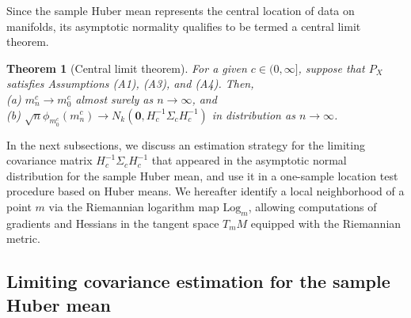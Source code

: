 \documentclass[preprint]{imsart}
\theoremstyle{plain}
\newtheorem{theorem}{Theorem}
\theoremstyle{remark}
\begin{document}
 
Since the sample Huber mean represents the central location of data on manifolds, its asymptotic normality qualifies to be termed a central limit theorem.
\begin{theorem}[Central limit theorem]\label{thm:clt}
For a given $c \in (0, \infty]$, suppose that $P_{X}$ satisfies Assumptions (A1), (A3), and (A4). Then, \\
(a) $m^{c}_{n} \rightarrow m^{c}_{0}$ almost surely as $n \rightarrow \infty$, and \\
(b) $\sqrt{n}\phi_{m^{c}_{0}}(m^{c}_{n}) \rightarrow N_{k}(\mathbf{0}, H_{c}^{-1}\Sigma_{c} H_{c}^{-1})$ in distribution as $n \rightarrow \infty$.
\end{theorem}



In the next subsections, we discuss an estimation strategy for the limiting covariance matrix $H_c^{-1}\Sigma_{c}H_c^{-1}$ that appeared in the asymptotic normal distribution for the sample Huber mean, and use it in a one-sample location test procedure based on Huber means. We hereafter identify a local neighborhood of a point $m$ via the Riemannian logarithm map $\mbox{Log}_m$, allowing computations of gradients and Hessians in the tangent space $T_mM$ equipped with the Riemannian metric.

\subsection{Limiting covariance estimation for the sample Huber mean}\label{subsec:est:cov}
\end{document}
